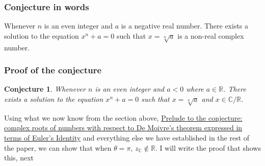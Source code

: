 \documentclass{turabian-researchpaper}
\newtheorem*{conjecture*}{Conjecture}
\begin{document}
\subsubsection{Conjecture in words} 

Whenever \(n\) is an even integer and \(a\) is a negative real number. There exists a solution to the equation \(x^n + a = 0\) such that \(x = \sqrt[n]{a}\) is a non-real complex number. 

\subsubsection{Proof of the conjecture}

\begin{conjecture*}
    Whenever \(n\) is an even integer and \(a < 0\) where \(a \in \mathds{R}\). There exists a solution to the equation \(x^n + a = 0\) such that \(x = \sqrt[n]{a}\) and \(x \in \mathds{C}/\mathds{R}\). 
\end{conjecture*}

Using what we now know from the section above, \hyperlink{Prelude}{Prelude to the conjecture: complex roots of numbers with respect to De Moivre's theorem expressed in terms of Euler's Identity} and everything else we have established in the rest of the paper, we can show that when \(\theta = \pi\), \(z_{\mathds{C}} \notin \mathds{R}\). I will write the proof that shows this, next 
\end{document}
